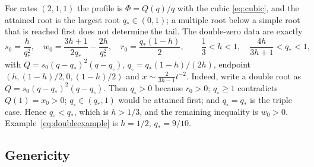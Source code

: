 \documentclass[11pt,a4paper]{article}
\theoremstyle{definition}\newtheorem{definition}[theorem]{Definition}
\theoremstyle{remark}\newtheorem{remark}[theorem]{Remark}
\begin{document}
For rates $(2,1,1)$ the profile is $\Phi=Q(q)/q$ with the cubic
\eqref{eq:cubic}, and the attained root is the largest root
$q_*\in(0,1)$; a multiple root below a simple root that is reached first
does not determine the tail. The double-zero data are exactly
\begin{equation}
s_0=\frac h{q_*^2},\quad w_0=\frac{3h+1}{2q_*}-\frac{2h}{q_*^2},\quad
r_0=\frac{q_*(1-h)}2,\qquad \frac13<h<1,\quad \frac{4h}{3h+1}<q_*<1,
\label{eq:doublefamily}
\end{equation}
with $Q=s_0(q-q_*)^2(q-q_\circ)$, $q_\circ=q_*(1-h)/(2h)$, endpoint
$(h,(1-h)/2,0,(1-h)/2)$ and $x\sim\frac2{3h-1}t^{-2}$. Indeed, write a
double root as $Q=s_0(q-q_*)^2(q-q_\circ)$. Then $q_\circ>0$ because
$r_0>0$; $q_\circ\ge1$ contradicts $Q(1)=x_0>0$; $q_\circ\in(q_*,1)$ would
be attained first; and $q_\circ=q_*$ is the triple case. Hence
$q_\circ<q_*$, which is $h>1/3$, and the remaining inequality is $w_0>0$.
Example~\eqref{eq:doubleexample} is $h=1/2$, $q_*=9/10$.

\subsection{Genericity}
\end{document}
